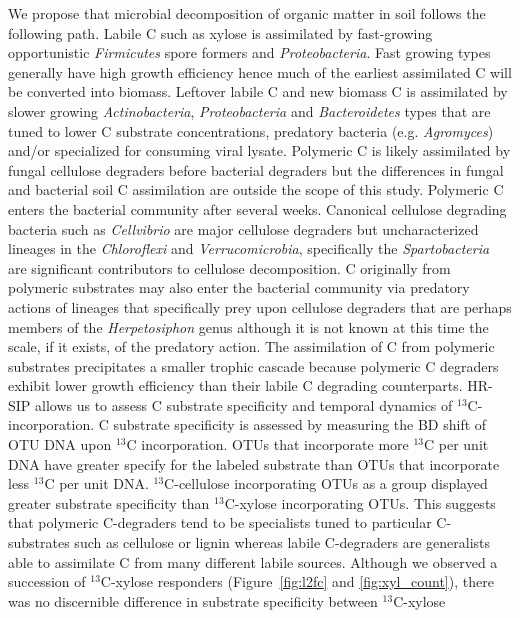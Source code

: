 We propose that microbial decomposition of organic matter in soil follows the
following path. Labile C such as xylose is assimilated by fast-growing
opportunistic \textit{Firmicutes} spore formers and \textit{Proteobacteria}.
Fast growing types generally have high growth efficiency hence much of the
earliest assimilated C will be converted into biomass. Leftover labile C and
new biomass C is assimilated by slower growing \textit{Actinobacteria},
\textit{Proteobacteria} and \textit{Bacteroidetes} types that are tuned to
lower C substrate concentrations, predatory bacteria (e.g. \textit{Agromyces})
and/or specialized for consuming viral lysate. Polymeric C is likely
assimilated by fungal cellulose degraders before bacterial degraders but the
differences in fungal and bacterial soil C assimilation are outside the scope
of this study. Polymeric C enters the bacterial community after several weeks.
Canonical cellulose degrading bacteria such as \textit{Cellvibrio} are major
cellulose degraders but uncharacterized lineages in the \textit{Chloroflexi}
and \textit{Verrucomicrobia}, specifically the \textit{Spartobacteria} are
significant contributors to cellulose decomposition.  C originally from
polymeric substrates may also enter the bacterial community via predatory
actions of lineages that specifically prey upon cellulose degraders that are
perhaps members of the \textit{Herpetosiphon} genus although it is not known at
this time the scale, if it exists, of the predatory action. The assimilation of
C from polymeric substrates precipitates a smaller trophic cascade because
polymeric C degraders exhibit lower growth efficiency than their labile C
degrading counterparts.
HR-SIP allows us to assess C substrate specificity and temporal dynamics of
$^{13}$C-incorporation. C substrate specificity is assessed by measuring the BD
shift of OTU DNA upon $^{13}$C incorporation. OTUs that incorporate more
$^{13}$C per unit DNA have greater specify for the labeled substrate than OTUs
that incorporate less $^{13}$C per unit DNA. $^{13}$C-cellulose incorporating
OTUs as a group displayed greater substrate specificity than $^{13}$C-xylose
incorporating OTUs. This suggests that polymeric C-degraders tend to be
specialists tuned to particular C-substrates such as cellulose or lignin
whereas labile C-degraders are generalists able to assimilate C from many
different labile sources. Although we observed a succession of $^{13}$C-xylose
responders (Figure~\ref{fig:l2fc} and \ref{fig:xyl_count}), there was no
discernible difference in substrate specificity between $^{13}$C-xylose
